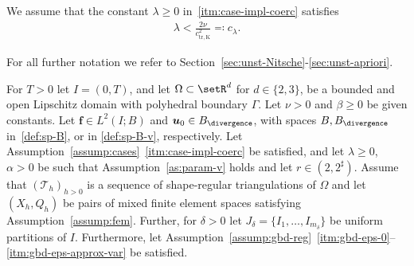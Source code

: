 \documentclass[reqno,a4paper]{amsart}
\def\vec#1{\boldsymbol{#1}}
\def\Bdiv{{B_{\divergence}}}
\def\bf{\vec{f}}
\def\bu{\vec{u}}
\def\tria{\mathcal{T}_h}
\begin{document}
	\begin{assumption}[parameters]\label{as:param-v}
		We assume that the constant $\lambda \geq 0$ in~\ref{itm:case-impl-coerc} satisfies 
		\begin{align}\label{est:lambda-v}
			\lambda < \frac{2 \nu}{c_{\mathrm{tr,K}}^2} \eqqcolon c_\lambda. 
		\end{align}
	\end{assumption}
	
	For all further notation we refer to Section~\ref{sec:unst-Nitsche}-\ref{sec:unst-apriori}. 
	
	\begin{theorem}\label{thm:main-unsteady-v}
		For $T>0$ let $I = (0,T)$, and let $\Omega \subset \setR^d$ for $d \in \{2,3\}$, be a bounded and open Lipschitz domain with polyhedral boundary $\Gamma$. %
		Let $\nu>0$ and $\beta \geq  0$ be given constants. 
		Let $ \bf \in L^2(I;B)$ and $ \bu_0 \in \Bdiv$, with spaces $B,\Bdiv$ in~\eqref{def:sp-B}, or in \eqref{def:sp-B-v}, respectively. 
		Let Assumption~\ref{assump:cases}~\ref{itm:case-impl-coerc} be satisfied, and let $\lambda\geq 0$, $\alpha>0$ be such that Assumption~\ref{as:param-v} holds and let $r \in (2,2^\sharp)$. 
		Assume that $(\tria)_{h>0}$ is a sequence of shape-regular triangulations of $\Omega$ and let $(X_h,Q_h)$ be pairs of mixed finite element spaces satisfying Assumption~\ref{assump:fem}. 
		Further, for $\delta>0$  let $J_{\delta} = \{I_1, \ldots, I_{m_{\delta}}\}$ be uniform partitions of $I$. 
		Furthermore, let Assumption~\ref{assump:gbd-reg}~\ref{itm:gbd-eps-0}--\ref{itm:gbd-eps-approx-var} be satisfied. 
		

\end{theorem}
\end{document}

